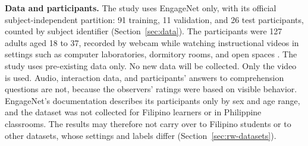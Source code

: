\textbf{Data and participants.} The study uses EngageNet \cite{singh2023} only, with its official subject-independent partition: 91 training, 11 validation, and 26 test participants, counted by subject identifier (Section~\ref{sec:data}). The participants were 127 adults aged 18 to 37, recorded by webcam while watching instructional videos in settings such as computer laboratories, dormitory rooms, and open spaces \cite{singh2023}. The study uses pre-existing data only. No new data will be collected. Only the video is used. Audio, interaction data, and participants' answers to comprehension questions are not, because the observers' ratings were based on visible behavior. EngageNet's documentation describes its participants only by sex and age range, and the dataset was not collected for Filipino learners or in Philippine classrooms. The results may therefore not carry over to Filipino students or to other datasets, whose settings and labels differ (Section~\ref{sec:rw-datasets}).

